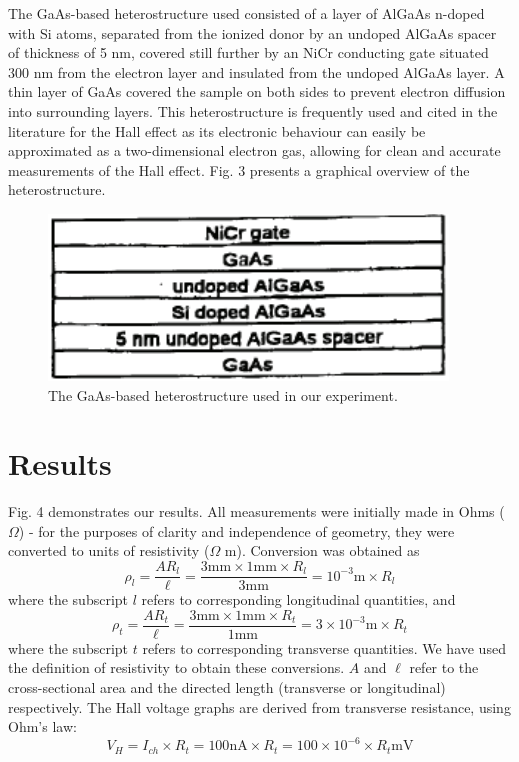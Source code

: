 \documentclass[aps,prl,nofootinbib,twocolumn,superscriptaddress,groupedaddress]{revtex4}  %
\begin{document}
The GaAs-based heterostructure used consisted of a layer of AlGaAs n-doped with Si atoms, separated from the ionized donor by an undoped AlGaAs spacer of thickness of 5 nm, covered still further by an NiCr conducting gate situated 300 nm from the electron layer and insulated from the undoped AlGaAs layer. A thin layer of GaAs covered the sample on both sides to prevent electron diffusion into surrounding layers. This heterostructure is frequently used and cited in the literature for the Hall effect as its electronic behaviour can easily be approximated as a two-dimensional electron gas\cite{lab,nobel}, allowing for clean and accurate measurements of the Hall effect. Fig. 3 presents a graphical overview of the heterostructure. 

\begin{figure}[t]
\centering
\includegraphics[scale=0.8]{Heterostructure.png} 
\caption{The GaAs-based heterostructure used in our experiment\cite{lab}.}
\end{figure}

\section{Results}

Fig. 4 demonstrates our results. All measurements were initially made in Ohms ($\Omega$) - for the purposes of clarity and independence of geometry, they were converted to units of resistivity ($\Omega$ m). Conversion was obtained as 
\begin{equation}
\rho_{l} = \frac{AR_{l}}{\ell} = \frac{3\mathrm{mm} \times 1 \mathrm{mm} \times R_{l}}{3 \mathrm{mm}} = 10^{-3} \mathrm{m} \times R_{l} 
\end{equation}
where the subscript $l$ refers to corresponding longitudinal quantities, and
\begin{equation}
\rho_{t} = \frac{AR_{t}}{\ell} = \frac{3\mathrm{mm} \times 1 \mathrm{mm} \times R_{t}}{1 \mathrm{mm}} = 3 \times 10^{-3} \mathrm{m} \times R_{t}
\end{equation}
where the subscript $t$ refers to corresponding transverse quantities. We have used the definition of resistivity to obtain these conversions. $A$ and $\ell$ refer to the cross-sectional area and the directed length (transverse or longitudinal) respectively. The Hall voltage graphs are derived from transverse resistance, using Ohm's law:
\begin{equation}
V_{H} = I_{ch}\times R_{t} = 100 \mathrm{nA}\times R_{t} = 100 \times 10^{-6} \times R_{t} \mathrm{mV}
\end{equation}
\end{document}
